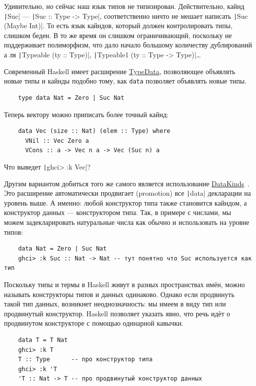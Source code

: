 Удивительно, но сейчас наш язык типов не типизирован.
Действительно, кайнд \texttt|Suc| --- \texttt|Suc :: Type -> Type|, соответственно ничто не мешает написать \texttt|Suc (Maybe Int)|.
То есть язык кайндов, который должен контролировать типы, слишком беден.
В то же время он слишком ограничивающий, поскольку не поддерживает полиморфизм, что дало начало большому количеству дублирований а ля \texttt|Typeable (ty :: Type)|, \texttt|Typeable1 (ty :: Type -> Type)|\ldots

Современный Haskell имеет расширение \href{https://downloads.haskell.org/ghc/latest/docs/users_guide/exts/type_data.html#extension-TypeData}{TypeData}, позволяющее объявлять новые типы и кайнды подобно тому, как \texttt{data} позволяет объявлять новые типы.
\begin{verbatim}
    type data Nat = Zero | Suc Nat
\end{verbatim}

Теперь вектору можно приписать более точный кайнд:
\begin{verbatim}
    data Vec (size :: Nat) (elem :: Type) where
      VNil :: Vec Zero a
      VCons :: a -> Vec n a -> Vec (Suc n) a
\end{verbatim}

\begin{task}
    Что выведет \texttt|ghci> :k Vec|?
\end{task}

Другим вариантом добиться того же самого является использование \href{https://downloads.haskell.org/ghc/latest/docs/users_guide/exts/data_kinds.html#extension-DataKinds}{DataKinds}~\cite{yorgey2012giving}.
Это расширение автоматически продвигает (promotion) все \texttt|data| декларации на уровень выше.
А именно: любой конструктор типа также становится кайндом, а конструктор данных --- конструктором типа.
Так, в примере с числами, мы можем задекларировать натуральные числа как обычно и использовать на уровне типов:
\begin{verbatim}
    data Nat = Zero | Suc Nat
    ghci> :k Suc :: Nat -> Nat -- тут понятно что Suc используется как тип
\end{verbatim}

Поскольку типы и термы в Haskell живут в разных пространствах имён, можно называть конструкторы типов и данных одинаково.
Однако если продвинуть такой тип данных, возникнет неоднозначность: мы имеем в виду тип или продвинутый конструктор.
Haskell позволяет указать явно, что речь идёт о продвинутом конструкторе с помощью одинарной кавычки.
\begin{verbatim}
    data T = T Nat
    ghci> :k T
    T :: Type      -- про конструктор типа
    ghci> :k 'T
    'T :: Nat -> T -- про продвинутый конструктор данных
\end{verbatim}

